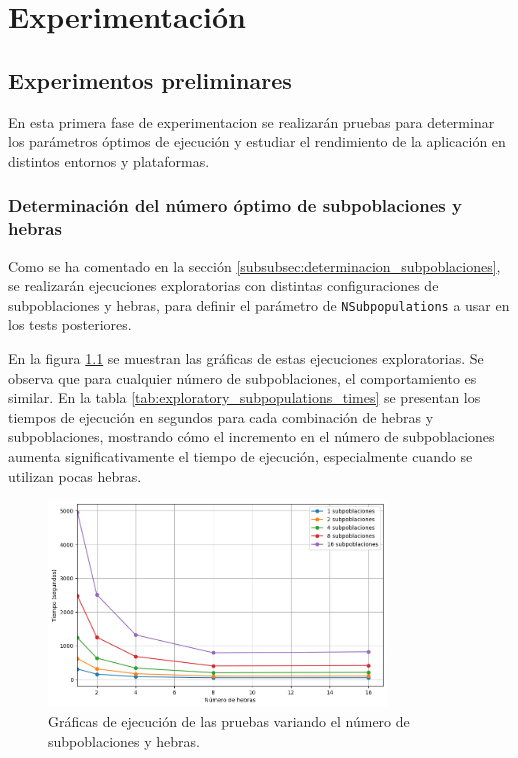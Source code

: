 \chapter{Experimentación}\label{cap:experimentacion}

\section{Experimentos preliminares}

En esta primera fase de experimentacion se realizarán pruebas para determinar los parámetros óptimos de ejecución y estudiar el rendimiento de la aplicación en distintos entornos y plataformas.

\subsection{Determinación del número óptimo de subpoblaciones y hebras}

Como se ha comentado en la sección \ref{subsubsec:determinacion_subpoblaciones}, se realizarán ejecuciones exploratorias con distintas configuraciones de subpoblaciones y hebras, para definir el parámetro de \texttt{NSubpopulations} a usar en los tests posteriores.

En la figura \ref{fig:exploratory_subpopulations} se muestran las gráficas de estas ejecuciones exploratorias. Se observa que para cualquier número de subpoblaciones, el comportamiento es similar. En la tabla \ref{tab:exploratory_subpopulations_times} se presentan los tiempos de ejecución en segundos para cada combinación de hebras y subpoblaciones, mostrando cómo el incremento en el número de subpoblaciones aumenta significativamente el tiempo de ejecución, especialmente cuando se utilizan pocas hebras.

\begin{figure}[ht]
    \centering
    \includegraphics[width=0.8\textwidth]{imagenes/cap5/exploratory_subpopulations.png}
    \caption{Gráficas de ejecución de las pruebas variando el número de subpoblaciones y hebras.}
    \label{fig:exploratory_subpopulations}
\end{figure}

